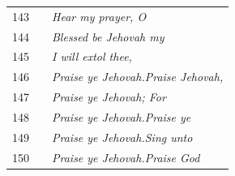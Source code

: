 \documentclass{article}
\newlength{\minipageheight}
\newlength{\minipagewidth}
\begin{document}
\begin{minipage}[r][\minipageheight][t]{\minipagewidth}
\begin{longtable}{ccl}
        143         &              & \textit{Hear my prayer, O}                 \\
        144         &              & \textit{Blessed be Jehovah my}             \\
        145         &              & \textit{I will extol thee,}                \\
        146         &              & \textit{Praise ye Jehovah.Praise Jehovah,} \\
        147         &              & \textit{Praise ye Jehovah; For}            \\
        148         &              & \textit{Praise ye Jehovah.Praise ye}       \\
        149         &              & \textit{Praise ye Jehovah.Sing unto}       \\
        150         &              & \textit{Praise ye Jehovah.Praise God}      \\


\end{longtable}
\end{minipage}
\end{document}
